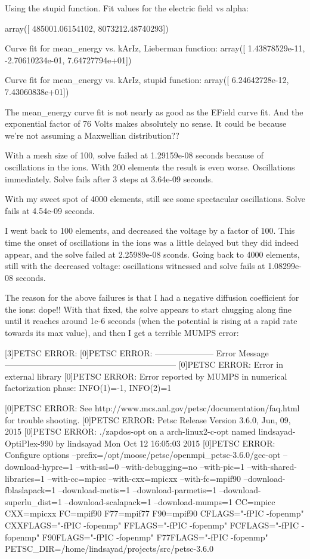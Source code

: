 {Using the stupid function. Fit values for the electric field vs alpha:

array([  485001.06154102,  8073212.48740293])

Curve fit for mean_energy vs. kArIz, Lieberman function:
array([  1.43878529e-11,  -2.70610234e-01,   7.64727794e+01])

Curve fit for mean_energy vs. kArIz, stupid function:
array([  6.24642728e-12,   7.43060838e+01])

The mean_energy curve fit is not nearly as good as the EField curve fit. And the exponential factor of 76 Volts makes absolutely no sense. It could be because we're not assuming a Maxwellian distribution??

With a mesh size of 100, solve failed at 1.29159e-08 seconds because of oscillations in the ions. With 200 elements the result is even worse. Oscillations immediately. Solve fails after 3 steps at 3.64e-09 seconds.

With my sweet spot of 4000 elements, still see some spectacular oscillations. Solve fails at 4.54e-09 seconds.

I went back to 100 elements, and decreased the voltage by a factor of 100. This time the onset of oscillations in the ions was a little delayed but they did indeed appear, and the solve failed at 2.25989e-08 sconds. Going back to 4000 elements, still with the decreased voltage: oscillations witnessed and solve fails at 1.08299e-08 seconds.

The reason for the above failures is that I had a negative diffusion coefficient for the ions: dope!! With that fixed, the solve appears to start chugging along fine until it reaches around 1e-6 seconds (when the potential is rising at a rapid rate towards its max value), and then I get a terrible MUMPS error:

[3]PETSC ERROR: [0]PETSC ERROR: --------------------- Error Message --------------------------------------------------------------
[0]PETSC ERROR: Error in external library
[0]PETSC ERROR: Error reported by MUMPS in numerical factorization phase: INFO(1)=-1, INFO(2)=1

[0]PETSC ERROR: See http://www.mcs.anl.gov/petsc/documentation/faq.html for trouble shooting.
[0]PETSC ERROR: Petsc Release Version 3.6.0, Jun, 09, 2015
[0]PETSC ERROR: ./zapdos-opt on a arch-linux2-c-opt named lindsayad-OptiPlex-990 by lindsayad Mon Oct 12 16:05:03 2015
[0]PETSC ERROR: Configure options --prefix=/opt/moose/petsc/openmpi_petsc-3.6.0/gcc-opt --download-hypre=1 --with-ssl=0 --with-debugging=no --with-pic=1 --with-shared-libraries=1 --with-cc=mpicc --with-cxx=mpicxx --with-fc=mpif90 --download-fblaslapack=1 --download-metis=1 --download-parmetis=1 --download-superlu_dist=1 --download-scalapack=1 --download-mumps=1 CC=mpicc CXX=mpicxx FC=mpif90 F77=mpif77 F90=mpif90 CFLAGS="-fPIC -fopenmp" CXXFLAGS="-fPIC -fopenmp" FFLAGS="-fPIC -fopenmp" FCFLAGS="-fPIC -fopenmp" F90FLAGS="-fPIC -fopenmp" F77FLAGS="-fPIC -fopenmp" PETSC_DIR=/home/lindsayad/projects/src/petsc-3.6.0


}
